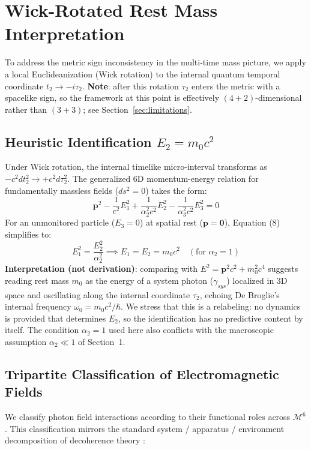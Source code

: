 \documentclass[11pt,a4paper]{article}
\begin{document}
\section{Wick-Rotated Rest Mass Interpretation}

To address the metric sign inconsistency in the multi-time mass picture, we apply a local Euclideanization (Wick rotation) to the internal quantum temporal coordinate $t_2 \to -i \tau_2$. \textbf{Note}: after this rotation $\tau_2$ enters the metric with a spacelike sign, so the framework at this point is effectively $(4+2)$-dimensional rather than $(3+3)$; see Section~\ref{sec:limitations}.

\subsection{Heuristic Identification $E_2 = m_0 c^2$}
Under Wick rotation, the internal timelike micro-interval transforms as $-c^2 dt_2^2 \to +c^2 d\tau_2^2$. The generalized 6D momentum-energy relation for fundamentally massless fields ($ds^2 = 0$) takes the form:
\begin{equation}
\mathbf{p}^2 - \frac{1}{c^2} E_1^2 + \frac{1}{\alpha_2^2 c^2} E_2^2 - \frac{1}{\alpha_3^2 c^2} E_3^2 = 0
\end{equation}
For an unmonitored particle ($E_3 = 0$) at spatial rest ($\mathbf{p} = \mathbf{0}$), Equation (8) simplifies to:
\begin{equation}
E_1^2 = \frac{E_2^2}{\alpha_2^2} \implies E_1 = E_2 = m_0 c^2 \quad (\text{for } \alpha_2 = 1)
\end{equation}
\textbf{Interpretation (not derivation)}: comparing with $E^2 = \mathbf{p}^2c^2 + m_0^2c^4$ suggests reading rest mass $m_0$ as the energy of a system photon ($\gamma_{sys}$) localized in 3D space and oscillating along the internal coordinate $\tau_2$, echoing De Broglie's internal frequency $\omega_0 = m_0 c^2 / \hbar$. We stress that this is a relabeling: no dynamics is provided that determines $E_2$, so the identification has no predictive content by itself. The condition $\alpha_2 = 1$ used here also conflicts with the macroscopic assumption $\alpha_2 \ll 1$ of Section~1.

\subsection{Tripartite Classification of Electromagnetic Fields}
We classify photon field interactions according to their functional roles across $\mathcal{M}^6$. This classification mirrors the standard system / apparatus / environment decomposition of decoherence theory \cite{Zurek2003}:
\end{document}
